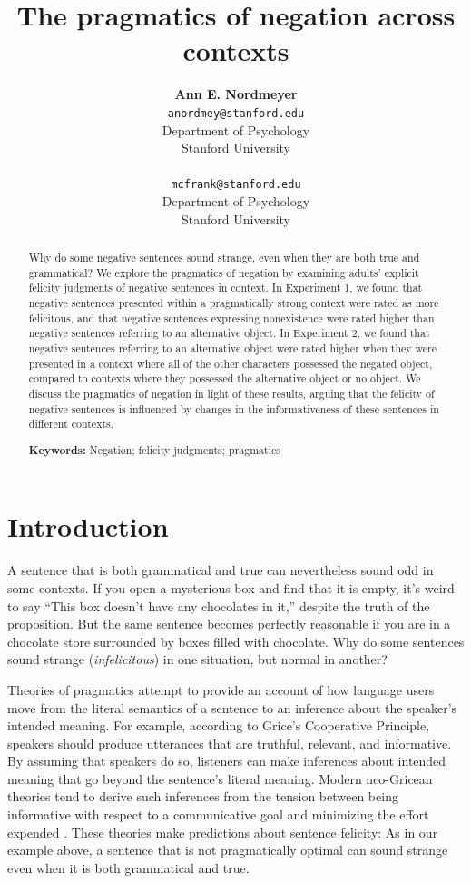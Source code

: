 \documentclass[10pt,letterpaper]{article}
\title{The pragmatics of negation across contexts}
\author{{\large \bf Ann E. Nordmeyer} \\ \texttt{anordmey@stanford.edu}\\ Department of Psychology \\ Stanford University \\ 
\And {\large \bf Michael C. Frank} \\ \texttt{mcfrank@stanford.edu} \\ Department of Psychology \\ Stanford University \\ }
\begin{document}
\maketitle


\begin{abstract}
Why do some negative sentences sound strange, even when they are both true and grammatical? We explore the pragmatics of negation by examining adults' explicit felicity judgments of negative sentences in context.  In Experiment 1, we found that negative sentences presented within a pragmatically strong context were rated as more felicitous, and that negative sentences expressing nonexistence were rated higher than negative sentences referring to an alternative object.  In Experiment 2, we found that negative sentences referring to an alternative object were rated higher when they were presented in a context where all of the other characters possessed the negated object, compared to contexts where they possessed the alternative object or no object.  We discuss the pragmatics of negation in light of these results, arguing that the felicity of negative sentences is influenced by changes in the informativeness of these sentences in different contexts. 

\textbf{Keywords:} 
Negation; felicity judgments; pragmatics
\end{abstract}

\section{Introduction}
A sentence that is both grammatical and true can nevertheless sound odd in some contexts. If you open a mysterious box and find that it is empty, it's weird to say ``This box doesn't have any chocolates in it,'' despite the truth of the proposition. But the same sentence becomes perfectly reasonable if you are in a chocolate store surrounded by boxes filled with chocolate.  Why do some sentences sound strange (\emph{infelicitous}) in one situation, but normal in another?

Theories of pragmatics attempt to provide an account of how language users move from the literal semantics of a sentence to an inference about the speaker's intended meaning. For example, according to Grice's \citeyear{grice1975} Cooperative Principle, speakers should produce utterances that are truthful, relevant, and informative.  By assuming that speakers do so, listeners can make inferences about intended meaning that go beyond the sentence's literal meaning. Modern neo-Gricean theories tend to derive such inferences from the tension between being informative with respect to a communicative goal and minimizing the effort expended \cite{horn1984,levinson2000,frank2012}. These theories make predictions about sentence felicity: As in our example above, a sentence that is not pragmatically optimal can sound strange even when it is both grammatical and true.
\end{document}

